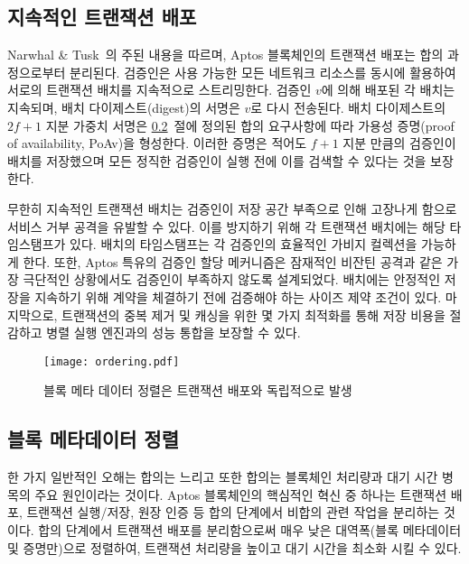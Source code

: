 \documentclass{article}
\begin{document}
\subsection{지속적인 트랜잭션 배포}
\label{continuous_txn_dissemination}

Narwhal \& Tusk~\cite{narwhal_tusk}의 주된 내용을 따르며, Aptos 블록체인의 트랜잭션 배포는 합의 과정으로부터 분리된다. 검증인은 사용 가능한 모든 네트워크 리소스를 동시에 활용하여 서로의 트랜잭션 배치를 지속적으로 스트리밍한다. 검증인 $v$에 의해 배포된 각 배치는 지속되며, 배치 다이제스트(digest)의 서명은 $v$로 다시 전송된다. 배치 다이제스트의 $2f+1$ 지분 가중치 서명은 \ref{subsec:block_metadata_ordering}~절에 정의된 합의 요구사항에 따라 가용성 증명(proof of availability, PoAv)을 형성한다. 이러한 증명은 적어도 $f+1$ 지분 만큼의 검증인이 배치를 저장했으며 모든 정직한 검증인이 실행 전에 이를 검색할 수 있다는 것을 보장한다.

무한히 지속적인 트랜잭션 배치는 검증인이 저장 공간 부족으로 인해 고장나게 함으로 서비스 거부 공격을 유발할 수 있다. 이를 방지하기 위해 각 트랜잭션 배치에는 해당 타임스탬프가 있다. 배치의 타임스탬프는 각 검증인의 효율적인 가비지 컬렉션을 가능하게 한다. 또한, Aptos 특유의 검증인 할당 메커니즘은 잠재적인 비잔틴 공격과 같은 가장 극단적인 상황에서도 검증인이 부족하지 않도록 설계되었다. 배치에는 안정적인 저장을 지속하기 위해 계약을 체결하기 전에 검증해야 하는 사이즈 제약 조건이 있다. 마지막으로, 트랜잭션의 중복 제거 및 캐싱을 위한 몇 가지 최적화를 통해 저장 비용을 절감하고 병렬 실행 엔진과의 성능 통합을 보장할 수 있다.

\begin{figure}
\centering
\texttt{[image: ordering.pdf]}
\caption{\label{fig:block}블록 메타 데이터 정렬은 트랜잭션 배포와 독립적으로 발생}
\end{figure}

\subsection{블록 메타데이터 정렬}
\label{subsec:block_metadata_ordering}

한 가지 일반적인 오해는 합의는 느리고 또한 합의는 블록체인 처리량과 대기 시간 병목의 주요 원인이라는 것이다. Aptos 블록체인의 핵심적인 혁신 중 하나는 트랜잭션 배포, 트랜잭션 실행/저장, 원장 인증 등 합의 단계에서 비합의 관련 작업을 분리하는 것이다. 합의 단계에서 트랜잭션 배포를 분리함으로써 매우 낮은 대역폭(블록 메타데이터 및 증명만)으로 정렬하여, 트랜잭션 처리량을 높이고 대기 시간을 최소화 시킬 수 있다.
\end{document}
